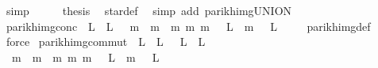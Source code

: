 \begin{isabellebody}
\ simp\isanewline
\ \ \isamarkupfalse%
\ \isamarkupfalse%
\ {\isacharquery}{\kern0pt}thesis\ \isamarkupfalse%
\ star{\isacharunderscore}{\kern0pt}def\ \isamarkupfalse%
\ {\isacharparenleft}{\kern0pt}simp\ add{\isacharcolon}{\kern0pt}\ parikh{\isacharunderscore}{\kern0pt}img{\isacharunderscore}{\kern0pt}UNION{\isacharparenright}{\kern0pt}\isanewline
{}\isamarkupfalse%
%
\endisatagproof
{\isafoldproof}%
%
\isadelimproof
\isanewline
%
\endisadelimproof
\isanewline
{}\isamarkupfalse%
\ parikh{\isacharunderscore}{\kern0pt}img{\isacharunderscore}{\kern0pt}conc{\isacharcolon}{\kern0pt}\ {\isachardoublequoteopen}{\isasymPsi}\ {\isacharparenleft}{\kern0pt}L{}\ {\isacharat}{\kern0pt}{\isacharat}{\kern0pt}\ L{}{\isacharparenright}{\kern0pt}\ {\isacharequal}{\kern0pt}\ {\isacharbraceleft}{\kern0pt}\ m{}\ {\isacharplus}{\kern0pt}\ m{}\ {\isacharbar}{\kern0pt}\ m{}\ m{}{\isachardot}{\kern0pt}\ m{}\ {\isasymin}\ {\isasymPsi}\ L{}\ {\isasymand}\ m{}\ {\isasymin}\ {\isasymPsi}\ L{}\ {\isacharbraceright}{\kern0pt}{\isachardoublequoteclose}\isanewline
%
\isadelimproof
\ \ %
\endisadelimproof
%
\isatagproof
{}\isamarkupfalse%
\ parikh{\isacharunderscore}{\kern0pt}img{\isacharunderscore}{\kern0pt}def\ \isamarkupfalse%
\ force%
\endisatagproof
{\isafoldproof}%
%
\isadelimproof
\isanewline
%
\endisadelimproof
\isanewline
{}\isamarkupfalse%
\ parikh{\isacharunderscore}{\kern0pt}img{\isacharunderscore}{\kern0pt}commut{\isacharcolon}{\kern0pt}\ {\isachardoublequoteopen}{\isasymPsi}\ {\isacharparenleft}{\kern0pt}L{}\ {\isacharat}{\kern0pt}{\isacharat}{\kern0pt}\ L{}{\isacharparenright}{\kern0pt}\ {\isacharequal}{\kern0pt}\ {\isasymPsi}\ {\isacharparenleft}{\kern0pt}L{}\ {\isacharat}{\kern0pt}{\isacharat}{\kern0pt}\ L{}{\isacharparenright}{\kern0pt}{\isachardoublequoteclose}\isanewline
%
\isadelimproof
%
\endisadelimproof
%
\isatagproof
{}\isamarkupfalse%
\ {\isacharminus}{\kern0pt}\isanewline
\ \ \isamarkupfalse%
\ {\isachardoublequoteopen}{\isacharbraceleft}{\kern0pt}\ m{}\ {\isacharplus}{\kern0pt}\ m{}\ {\isacharbar}{\kern0pt}\ m{}\ m{}{\isachardot}{\kern0pt}\ m{}\ {\isasymin}\ {\isasymPsi}\ L{}\ {\isasymand}\ m{}\ {\isasymin}\ {\isasymPsi}\ L{}\ {\isacharbraceright}{\kern0pt}\ {\isacharequal}{\kern0pt}\ \isanewline

\end{isabellebody}
